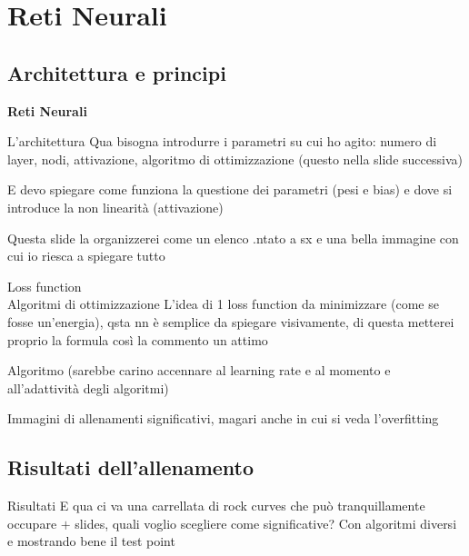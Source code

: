 \documentclass{beamer}
\begin{document}
\section{Reti Neurali}
\subsection{Architettura e principi}
\begin{frame}
  \centering
  \Huge\bfseries
  Reti Neurali
\end{frame}

\begin{frame}{L'architettura}
  Qua bisogna introdurre i parametri su cui ho agito: numero di layer, nodi, attivazione, algoritmo di ottimizzazione (questo nella slide successiva)

  E devo spiegare come funziona la questione dei parametri (pesi e bias) e dove si introduce la non linearità (attivazione)

  Questa slide la organizzerei come un elenco .ntato a sx e una bella immagine con cui io riesca a spiegare tutto 
\end{frame}

\begin{frame}{Loss function \\Algoritmi di ottimizzazione}
  L'idea di 1 loss function da minimizzare (come se fosse un'energia), qsta nn è semplice da spiegare visivamente, di questa metterei proprio la formula così la commento un attimo

  Algoritmo (sarebbe carino accennare al learning rate e al momento e all'adattività degli algoritmi)


  Immagini di allenamenti significativi, magari anche in cui si veda l'overfitting

\end{frame}

\subsection{Risultati dell'allenamento}
\begin{frame}{Risultati}
  E qua ci va una carrellata di rock curves che può tranquillamente occupare $+$ slides, quali voglio scegliere come significative? Con algoritmi diversi e mostrando bene il test point

\end{frame}
\end{document}

